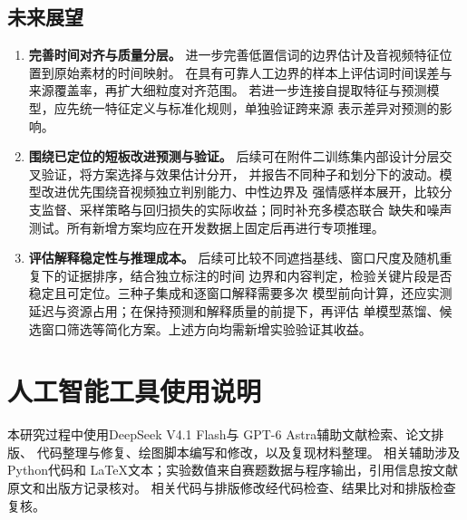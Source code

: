 \documentclass[bwprint]{gmcmthesis}
\begin{document}
\subsection{未来展望}
\begin{enumerate}
 \item \textbf{完善时间对齐与质量分层。}
 进一步完善低置信词的边界估计及音视频特征位置到原始素材的时间映射。
 在具有可靠人工边界的样本上评估词时间误差与来源覆盖率，再扩大细粒度对齐范围。
 若进一步连接自提取特征与预测模型，应先统一特征定义与标准化规则，单独验证跨来源
 表示差异对预测的影响。

 \item \textbf{围绕已定位的短板改进预测与验证。}
 后续可在附件二训练集内部设计分层交叉验证，将方案选择与效果估计分开，
 并报告不同种子和划分下的波动。模型改进优先围绕音视频独立判别能力、中性边界及
 强情感样本展开，比较分支监督、采样策略与回归损失的实际收益；同时补充多模态联合
 缺失和噪声测试。所有新增方案均应在开发数据上固定后再进行专项推理。

 \item \textbf{评估解释稳定性与推理成本。}
 后续可比较不同遮挡基线、窗口尺度及随机重复下的证据排序，结合独立标注的时间
边界和内容判定，检验关键片段是否稳定且可定位。三种子集成和逐窗口解释需要多次
 模型前向计算，还应实测延迟与资源占用；在保持预测和解释质量的前提下，再评估
 单模型蒸馏、候选窗口筛选等简化方案。上述方向均需新增实验验证其收益。
\end{enumerate}

\section*{人工智能工具使用说明}
本研究过程中使用DeepSeek V4.1 Flash\citep{deepseek2026flash}与
GPT-6 Astra\citep{openai2026astra}辅助文献检索、论文排版、
代码整理与修复、绘图脚本编写和修改，以及复现材料整理。
相关辅助涉及Python代码和
LaTeX文本；实验数值来自赛题数据与程序输出，引用信息按文献原文和出版方记录核对。
相关代码与排版修改经代码检查、结果比对和排版检查复核。

\FloatBarrier
{}





\end{document}
